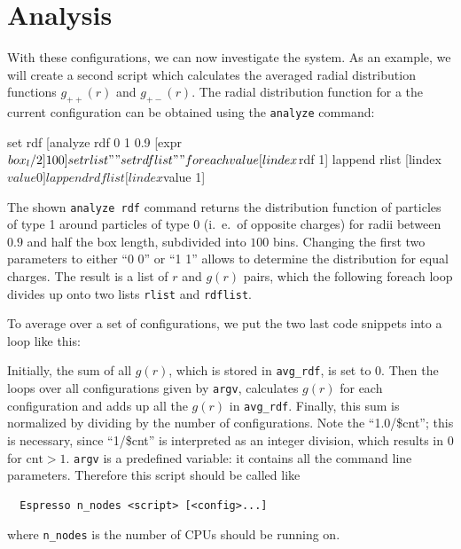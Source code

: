 \documentclass[
a4paper,                        %
11pt,                           %
twoside,                        %
footsepline,                    %
headsepline,                    %
headexclude,                    %
footexclude,                    %
pagesize,                       %
]{scrreprt}
\begin{document}
\section{Analysis}

With these configurations, we can now investigate the system. As an
example, we will create a second script which calculates the averaged
radial distribution functions $g_{++}(r)$ and $g_{+-}(r)$. The radial
distribution function for a the current configuration can be obtained
using the \verb|analyze| command:
\begin{tclcode}
  set rdf [analyze rdf 0 1 0.9 [expr $box_l/2] 100] set rlist "" set
  rdflist "" foreach value [lindex $rdf 1] { lappend rlist [lindex
    $value 0] lappend rdflist [lindex $value 1] }
\end{tclcode}
The shown \verb|analyze rdf| command returns the distribution function
of particles of type 1 around particles of type 0 (i.~e.\ of opposite
charges) for radii between $0.9$ and half the box length, subdivided
into $100$ bins.  Changing the first two parameters to either ``0 0''
or ``1 1'' allows to determine the distribution for equal charges. The
result is a list of $r$ and $g(r)$ pairs, which the following foreach
loop divides up onto two lists \verb|rlist| and \verb|rdflist|.

To average over a set of configurations, we put the two last code
snippets into a loop like this:
Initially, the sum of all $g(r)$, which is stored in \verb|avg_rdf|,
is set to 0.  Then the loops over all configurations given by
\verb|argv|, calculates $g(r)$ for each configuration and adds up all
the $g(r)$ in \verb|avg_rdf|.  Finally, this sum is normalized by
dividing by the number of configurations. Note the ``1.0/\$cnt''; this
is necessary, since ``1/\$cnt'' is interpreted as an integer division,
which results in 0 for $\text{cnt}>1$.  \verb|argv| is a predefined
variable: it contains all the command line parameters. Therefore this
script should be called like
\begin{verbatim}
  Espresso n_nodes <script> [<config>...]
\end{verbatim}
where \verb|n_nodes| is the number of CPUs \es should be running on.
\end{document}
